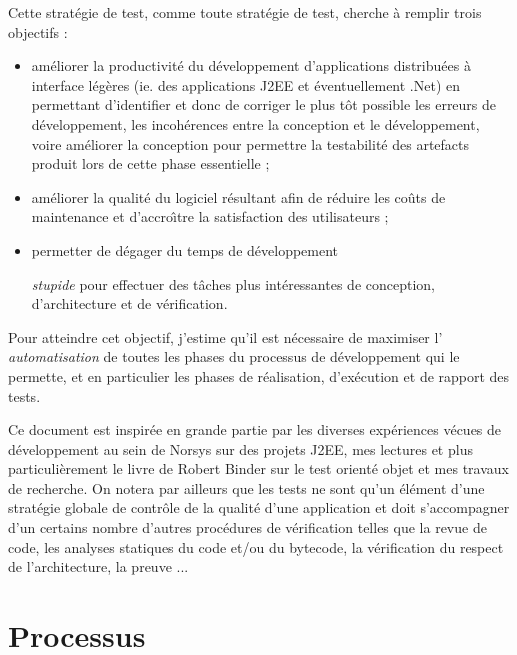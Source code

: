    Cette strat\'egie de test, comme toute strat\'egie de test, cherche \`a remplir trois objectifs :
   
\begin{itemize}
       
\item am\'eliorer la productivit\'e du d\'eveloppement d'applications
     distribu\'ees \`a interface l\'eg\`eres (ie. des applications J2EE et
     \'eventuellement .Net) en permettant d'identifier et donc de
     corriger le plus t\^ot possible les erreurs de d\'eveloppement, les
     incoh\'erences entre la conception et le d\'eveloppement, voire
     am\'eliorer la conception pour permettre la testabilit\'e des
     artefacts produit lors de cette phase essentielle ; 
\item am\'eliorer la qualit\'e du logiciel r\'esultant afin de r\'eduire les
     co\^uts de maintenance et d'accro\^{\i}tre la satisfaction des
     utilisateurs ; 
\item permetter de d\'egager du temps de d\'eveloppement
     
\emph{stupide}
   pour effectuer des t\^aches plus int\'eressantes
     de conception, d'architecture et de v\'erification.
\end{itemize}
  
   Pour atteindre cet objectif, j'estime qu'il est n\'ecessaire de
   maximiser l'
\emph{automatisation}
   de toutes les phases du
   processus de d\'eveloppement qui le permette, et en particulier les
   phases de r\'ealisation, d'ex\'ecution et de rapport des tests. 
  
\par
  
   Ce document est inspir\'ee en grande partie par les diverses exp\'eriences v\'ecues
   de d\'eveloppement au sein de Norsys sur des projets J2EE, mes
   lectures  et plus particuli\`erement le livre de Robert
   Binder sur le test orient\'e objet et mes travaux de recherche. 
   On notera par ailleurs que les tests ne sont qu'un \'el\'ement
   d'une strat\'egie globale de contr\^ole de la qualit\'e d'une
   application et doit s'accompagner d'un certains nombre d'autres
   proc\'edures de v\'erification telles que la revue de code, les
   analyses statiques du code et/ou du bytecode, la v\'erification du
   respect de l'architecture, la preuve ...
  
\par
  
\section{Processus}
  
